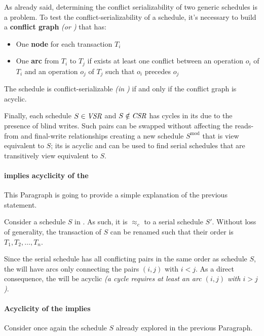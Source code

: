 \documentclass[english]{article}
\begin{document}
As already said, determining the conflict serializability of two generic schedules is a \NPC problem.
To test the conflict-serializability of a schedule, it's necessary to build a \textbf{conflict graph} \textit{(or \CG)} that has:

\begin{itemize}
  \item One \textbf{node} for each transaction \(T_i\)
  \item One \textbf{arc} from \(T_i\) to \(T_j\) if exists at least one conflict between an operation \(o_i\) of \(T_i\) and an operation \(o_j\) of \(T_j\) such that \(o_i\) precedes \(o_j\)
\end{itemize}

The schedule is conflict-serializable \textit{(in \CSR)} if and only if the conflict graph is acyclic.

\bigskip
Finally, each schedule \(S \in \textit{VSR}\) and \(S \notin \textit{CSR}\) has cycles in its \CG due to the presence of blind writes.
Such pairs can be swapped without affecting the reads-from and final-write relationships creating a new schedule \(S^\text{mod}\) that is view equivalent to \(S\);
its \CG is acyclic and can be used to find serial schedules that are transitively view equivalent to \(S\).

\paragraph{\CSR implies acyclicity of the \CG}

This Paragraph is going to provide a simple explanation of the previous statement.

Consider a schedule \(S\) in \CSR.
As such, it is \(\approx_c\) to a serial schedule \(S'\).
Without loss of generality, the transaction of \(S\) can be renamed such that their order is \(T_1, T_2, \dots, T_n\).

Since the serial schedule has all conflicting pairs in the same order as schedule \(S\), the \CG will have arcs only connecting the pairs \((i, j)\) with \(i < j\).
As a direct consequence, the \CG will be acyclic \textit{(a cycle requires at least an arc \((i, j)\) with \(i > j\))}.

\paragraph{Acyclicity of the \CG implies \CSR}

Consider once again the schedule \(S\) already explored in the previous Paragraph.
\end{document}
